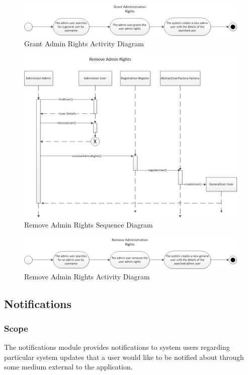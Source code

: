 \documentclass{article}
\begin{document}
    \begin{figure}[h!]
      \includegraphics[width=\textwidth]{Grant_Admin_Rights_Activity_Diagram.png}
      \caption{Grant Admin Rights Activity Diagram}
    \end{figure}
    
    \begin{figure}[h!]
      \includegraphics[width=\textwidth]{Remove_Admin_Rights_Sequence_Diagram.png}
      \caption{Remove Admin Rights Sequence Diagram}
    \end{figure}
    
    \begin{figure}[h!]
      \includegraphics[width=\textwidth]{Remove_Admin_Rights_Activity_Diagram.png}
      \caption{Remove Admin Rights Activity Diagram}
    \end{figure}
    
    \clearpage
    
\subsection{Notifications}
\subsubsection{Scope}
 The notifications module provides notifications to system users regarding
    particular system updates that a user would like to be notified about through
    some medium external to the application.
    
\end{document}
